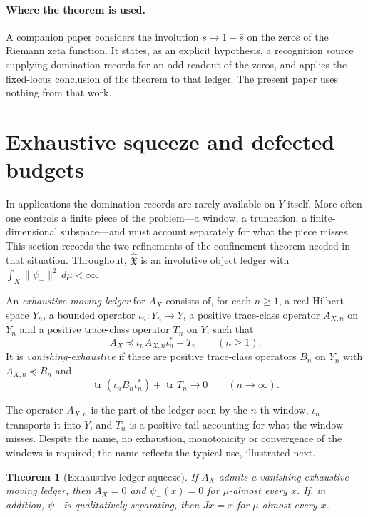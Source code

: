 \documentclass[11pt]{article}
\DeclareMathOperator{\trace}{tr}
\newcommand{\psim}{\psi_{-}}
\newcommand{\AX}{A_{X}}
\newcommand{\IOL}{\hat{\mathfrak{X}}}
\newtheorem{theorem}{Theorem}[section]
\theoremstyle{definition}
\begin{document}
\paragraph{Where the theorem is used.}
A companion paper \citep{TsiokosRHviaSDTC2026} considers the
involution \(s\mapsto1-\bar s\) on the zeros of the Riemann zeta
function.  It states, as an explicit hypothesis, a recognition source
supplying domination records for an odd readout of the zeros, and
applies the fixed-locus conclusion of the theorem to that ledger.  The
present paper uses nothing from that work.
 \section{Exhaustive squeeze and defected budgets}
\label{sec:exhaustive_squeeze_and_budgets}

In applications the domination records are rarely available on \(Y\)
itself.  More often one controls a finite piece of the problem---a
window, a truncation, a finite-dimensional subspace---and must account
separately for what the piece misses.  This section records the two
refinements of the confinement theorem needed in that situation.
Throughout, \(\IOL\) is an involutive object ledger with
\(\int_X\|\psim\|^2\,d\mu<\infty\).

\begin{definition}
\label{def:duality_confinement:exhaustive-moving-ledger}
An \emph{exhaustive moving ledger} for \(\AX\) consists of, for each
\(n\geq1\), a real Hilbert space \(Y_n\), a bounded operator
\(\iota_n:Y_n\to Y\), a positive trace-class operator \(A_{X,n}\) on
\(Y_n\) and a positive trace-class operator \(T_n\) on \(Y\), such that
\[
  \AX\preceq\iota_nA_{X,n}\iota_n^*+T_n\qquad(n\geq1).
\]
It is \emph{vanishing-exhaustive} if there are positive trace-class
operators \(B_n\) on \(Y_n\) with \(A_{X,n}\preceq B_n\) and
\[
  \trace(\iota_nB_n\iota_n^*)+\trace T_n\to0\qquad(n\to\infty).
\]
\end{definition}

The operator \(A_{X,n}\) is the part of the ledger seen by the
\(n\)-th window, \(\iota_n\) transports it into \(Y\), and \(T_n\) is a
positive tail accounting for what the window misses.  Despite the
name, no exhaustion, monotonicity or convergence of the windows is
required; the name reflects the typical use, illustrated next.

\begin{theorem}[Exhaustive ledger squeeze]
\label{thm:duality_confinement:exhaustive-squeeze}
If \(\AX\) admits a vanishing-exhaustive moving ledger, then
\(\AX=0\) and \(\psim(x)=0\) for \(\mu\)-almost every \(x\).  If, in
addition, \(\psim\) is qualitatively separating, then \(Jx=x\) for
\(\mu\)-almost every \(x\).
\end{theorem}
\end{document}
